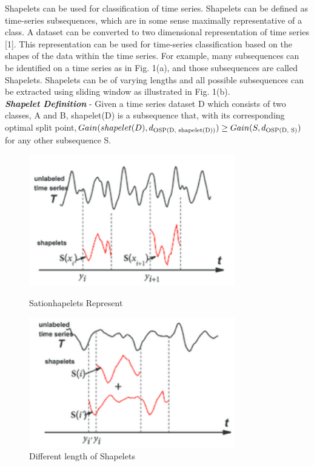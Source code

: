 \documentclass[letterpaper, 10 pt, conference]{IEEEtran}  %
\begin{document}
Shapelets can be used for classification of time series. Shapelets can be defined as time-series subsequences, which are in some sense maximally representative of a class. A dataset can be converted to two dimensional representation of time series [1]. This representation can be used for time-series classification based on the shapes of the data within the time series. For example, many subsequences can be identified on a time series as in Fig. 1(a), and those subsequences are called Shapelets. Shapelets can be of varying lengths and all possible subsequences can be extracted using sliding window as illustrated in Fig. 1(b).
\medskip\\
\textbf{\textit{Shapelet Definition}} - Given a time series dataset D which consists of two classes, A and B, shapelet(D) is a subsequence that, with its corresponding optimal split point,\(Gain(shapelet(D), d\textsubscript{OSP(D, shapelet(D))}) \geq Gain(S, d\textsubscript{OSP(D, S)})\) for any other subsequence S.
\begin{figure}
\centering
\parbox{9cm}{
\includegraphics[width=9cm]{shapelet1.png}
\caption{Sationhapelets Represent}
\label{fig:2figsA}}
\qquad
\begin{minipage}{9cm}
\includegraphics[width=9cm]{shapelet2.png}
\caption{Different length of Shapelets}
\label{fig:2figsB}
\end{minipage}
\end{figure}
\end{document}

